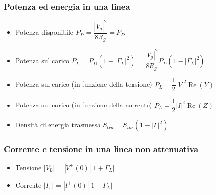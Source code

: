 \documentclass{article}
\begin{document}
\subsubsection{Potenza ed energia in una linea}
\begin{itemize}
	\item Potenza disponibile \( P_D = \dfrac{|V_g|^2}{8 R_g} = P_D \)
	\item Potenza sul carico \( P_L = P_D ( 1 - | \Gamma_L | ^ 2 ) = \dfrac{|V_g|^2}{8 R_g} P_D ( 1 - | \Gamma_L | ^ 2 ) \) 
	\item Potenza sul carico (in funzione della tensione) \( P_L = \dfrac{1}{2} |V|^2  \operatorname{Re}(Y) \)
	\item Potenza sul carico (in funzione della corrente) \( P_L = \dfrac{1}{2} |I|^2  \operatorname{Re}(Z) \)
	\item Densità di energia trasmessa \( S_{tra} = S_{inc} \left( 1 - \left|\Gamma \right| ^ 2 \right) \) 
\end{itemize}

\subsubsection{Corrente e tensione in una linea non attenuativa}
\begin{itemize}
	\item Tensione \(|V_L| = \left| V^+(0) \right| \left|1 + \Gamma_L \right|\)
	\item Corrente \(|I_L| = \left| I^+(0) \right| \left|1 - \Gamma_L \right|\)
\end{itemize}

\newpage
\end{document}
